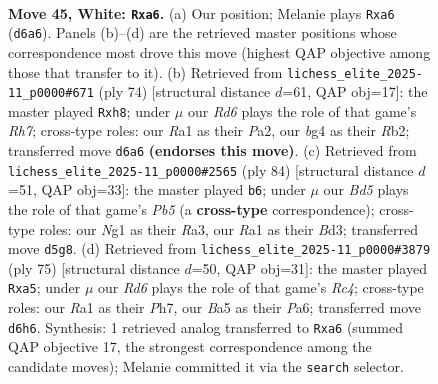 \documentclass[11pt]{article}
\begin{document}
\clearpage

\begin{figure}[p]\centering
\begin{subfigure}{0.46\textwidth}\centering
\resizebox{\linewidth}{!}{%
\newchessgame
\chessboard[
  setfen={6r1/r3k3/p2R4/B2B2p1/5pb1/PP6/1K5P/R5N1 w - - 3 45},
  showmover=false,
  pgfstyle=straightmove, color=movearrow, markmove={d6-a6}
]}
\caption{}
\end{subfigure}\hfill
\begin{subfigure}{0.46\textwidth}\centering
\resizebox{\linewidth}{!}{%
\newchessgame
\chessboard[
  setfen={1r5r/1b5R/5k2/pP3p2/8/4K2P/PR2B3/8 w - - 1 38},
  showmover=false,
  pgfstyle=straightmove, color=movearrow, markmove={h7-h8}
]}
\caption{}
\end{subfigure}
\\[4pt]
\begin{subfigure}{0.46\textwidth}\centering
\resizebox{\linewidth}{!}{%
\newchessgame
\chessboard[
  setfen={1r6/1b6/4k3/1P3R1p/6p1/R2BK1P1/P6r/8 w - - 1 43},
  showmover=false,
  pgfstyle=straightmove, color=movearrow, markmove={b5-b6}
]}
\caption{}
\end{subfigure}\hfill
\begin{subfigure}{0.46\textwidth}\centering
\resizebox{\linewidth}{!}{%
\newchessgame
\chessboard[
  setfen={2bN4/7p/p5k1/P1rn2p1/3B4/7P/5PP1/3R2K1 b - - 8 38},
  showmover=false,
  pgfstyle=straightmove, color=movearrow, markmove={c5-a5}
]}
\caption{}
\end{subfigure}
\caption{\textbf{Move 45, White: \texttt{Rxa6}.} (a) Our position; Melanie plays \texttt{Rxa6} (\texttt{d6a6}). Panels (b)--(d) are the retrieved master positions whose correspondence most drove this move (highest QAP objective among those that transfer to it). (b) Retrieved from \texttt{lichess\_elite\_2025-11\_p0000\#671} (ply 74) [structural distance $d$=61, QAP obj=17]: the master played \texttt{Rxh8}; under $\mu$ our \emph{Rd6} plays the role of that game's \emph{Rh7}; cross-type roles: our \emph{R}a1 as their \emph{P}a2, our \emph{b}g4 as their \emph{R}b2; transferred move \texttt{d6a6} \textbf{(endorses this move)}. (c) Retrieved from \texttt{lichess\_elite\_2025-11\_p0000\#2565} (ply 84) [structural distance $d$=51, QAP obj=33]: the master played \texttt{b6}; under $\mu$ our \emph{Bd5} plays the role of that game's \emph{Pb5} (a \textbf{cross-type} correspondence); cross-type roles: our \emph{N}g1 as their \emph{R}a3, our \emph{R}a1 as their \emph{B}d3; transferred move \texttt{d5g8}. (d) Retrieved from \texttt{lichess\_elite\_2025-11\_p0000\#3879} (ply 75) [structural distance $d$=50, QAP obj=31]: the master played \texttt{Rxa5}; under $\mu$ our \emph{Rd6} plays the role of that game's \emph{Rc4}; cross-type roles: our \emph{R}a1 as their \emph{P}h7, our \emph{B}a5 as their \emph{P}a6; transferred move \texttt{d6h6}. Synthesis: 1 retrieved analog transferred to \texttt{Rxa6} (summed QAP objective 17, the strongest correspondence among the candidate moves); Melanie committed it via the \texttt{search} selector.}
\label{fig:thought-m88}
\end{figure}
\end{document}
